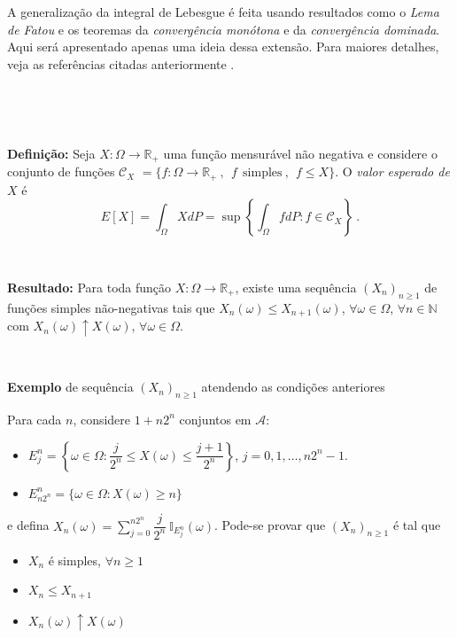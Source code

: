 \documentclass[
]{book}
\begin{document}
\(~\)

\(~\)

A generalização da integral de Lebesgue é feita usando resultados como o \emph{Lema de Fatou} e os teoremas da \emph{convergência monótona} e da \emph{convergência dominada}. Aqui será apresentado apenas uma ideia dessa extensão. Para maiores detalhes, veja as referências citadas anteriormente \citep{Ash00, Schervish12, Billingsley86, Shiryaev96}.

\(~\)

\(~\)

\textbf{Definição:} Seja \(X:\Omega\longrightarrow \mathbb{R}_+\) uma função mensurável não negativa e considere o conjunto de funções \(\mathcal{C}_X\) \(= \{ f:\Omega\longrightarrow \mathbb{R}_+~,~~f~~\text{simples}~,~~f \leq X\}\). O \emph{valor esperado de \(X\)} é
\[E[X]=\int_\Omega XdP=\sup\left\{\int_\Omega fdP: f\in \mathcal{C}_X\right\}~.\]

\(~\)

\textbf{Resultado:} Para toda função \(X:\Omega \longrightarrow \mathbb{R}_+\), existe uma sequência \((X_n)_{n\geq 1}\) de funções simples não-negativas tais que \(X_n(\omega)\leq X_{n+1}(\omega)\), \(\forall \omega \in \Omega\), \(\forall n \in \mathbb{N}\) com \(X_n(\omega)\uparrow X(\omega)\), \(\forall \omega \in \Omega\).

\(~\)

\textbf{Exemplo} de sequência \((X_n)_{n\geq 1}\) atendendo as condições anteriores

Para cada \(n\), considere \(1+n2^n\) conjuntos em \(\mathcal{A}:\)

\begin{itemize}
\item
  \(E_j^n = \left\{\omega \in \Omega: \dfrac{j}{2^n} \leq X(\omega) \leq \dfrac{j+1}{2^n} \right\}\), \(j = 0,1,\ldots,n2^n-1.\)
\item
  \(E_{n2^n}^n = \Big\{ \omega \in \Omega: X(\omega)\geq n \Big\}\)
\end{itemize}

e defina \(\displaystyle X_n(\omega) = \sum_{j=0}^{n2^n} \dfrac{j}{2^n} ~\mathbb{I}_{E_j^n}(\omega)\). Pode-se provar que \((X_n)_{n\geq 1}\) é tal que

\begin{itemize}
\item
  \(X_n\) é simples, \(\forall n \geq 1\)
\item
  \(X_n \leq X_{n+1}\)
\item
  \(X_{n}(\omega) \uparrow X(\omega)\)
\end{itemize}
\end{document}
